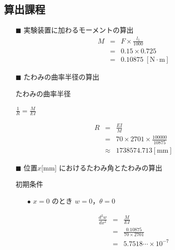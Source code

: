\documentclass[twocolumn,a4j]{jsarticle}
\begin{document}
\subsection{算出課程}
\begin{itemize}
    \item [$\blacksquare$] 実験装置に加わるモーメントの算出
    \begin{eqnarray*}
        M &=& F × \frac{l_1}{1000}\\
        &=& 0.15 × 0.725\\
        &=& 0.10875 \;\left[\mathrm{N \cdot m}\right]
    \end{eqnarray*}
    \item [$\blacksquare$] たわみの曲率半径の算出
    \begin{itembox}[l]{たわみの曲率半径}
        \begin{center}
            $\displaystyle \frac{1}{R} = \frac{M}{EI}$
        \end{center}
    \end{itembox}
    \begin{eqnarray*}
        R &=& \frac{EI}{M}\\
        &=& 70 × 2701 × \frac{100000}{10875}\\
        &\approx& 1738574.713 \left[\mathrm{mm}\right]
    \end{eqnarray*}
    \item [$\blacksquare$] 位置$x$[mm] におけるたわみ角とたわみの算出
    \begin{itembox}[l]{初期条件}
    \begin{itemize}
        \item [$\bullet$] $x=0$ のとき $w=0$，$\theta =0$
    \end{itemize}
    \end{itembox}
    \begin{eqnarray*}
        \frac{d^2w}{dx^2}&=&\frac{M}{EI}\\
        &=&\frac{0.10875}{70 × 2701}\\
        &=&5.7518 \cdots × 10^{-7}\\

\end{eqnarray*}
\end{itemize}
\end{document}
